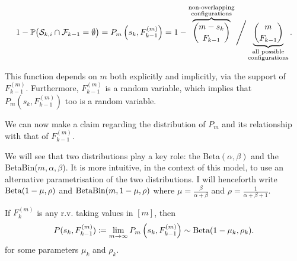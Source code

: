 \documentclass[../../main.tex]{subfiles}
\begin{document}
\begin{equation}
  1 - \P\big( \mathcal{S}_{k, i} \cap \mathcal{F}_{k - 1} = \emptyset \big) = P_m\left(s_k, F^{(m)}_{k - 1}\right) =  1 - \overbrace{\binom{m - s_k}{F_{k-1}}}^{\substack{\text{non-overlapping} \\ \text{configurations}}} \Bigg/ \underbrace{\binom{m}{F_{k-1}}}_{\substack{\text{all possible} \\ \text{configurations}}}. 
\end{equation}

This function depends on $m$ both explicitly and implicitly, via the support of $F^{(m)}_{k-1}$. Furthermore, $F^{(m)}_{k - 1}$ is a random variable, which implies that $P_m\left(s_k, F^{(m)}_{k - 1}\right)$ too is a random variable. 

We can now make a claim regarding the distribution of $P_m$ and its relationship with that of $F^{(m)}_{k - 1}$. 

We will see that two distributions play a key role: the Beta$(\alpha, \beta)$ and the BetaBin($m, \alpha, \beta$). It is more intuitive, in the context of this model, to use an alternative parametrisation of the two distributions. I will henceforth write $\Beta(1 - \mu, \rho)$ and $\Beta\Bin(m, 1 - \mu, \rho)$ where $\mu = \frac{\beta}{\alpha + \beta}$ and $\rho = \frac{1}{\alpha + \beta + 1}$.

\begin{lemma} \label{lemma:Ftop}
  If $F^{(m)}_k$ is any r.v. taking values in $[m]$, then \begin{equation*}P(s_k, F^{(m)}_{k - 1}) \coloneqq \lim_{m \rightarrow \infty} P_m\left(s_k, F^{(m)}_{k - 1}\right) \sim \Beta(1 - \mu_k, \rho_k).\end{equation*} for some parameters $\mu_k$ and $\rho_k$.
\end{lemma}
\end{document}
